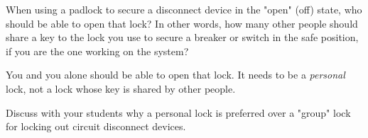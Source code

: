 

When using a padlock to secure a disconnect device in the "open" (off) state, who should be able to open that lock?  In other words, how many other people should share a key to the lock you use to secure a breaker or switch in the safe position, if you are the one working on the system?







You and you alone should be able to open that lock.  It needs to be a {\it personal} lock, not a lock whose key is shared by other people.







Discuss with your students why a personal lock is preferred over a "group" lock for locking out circuit disconnect devices.




